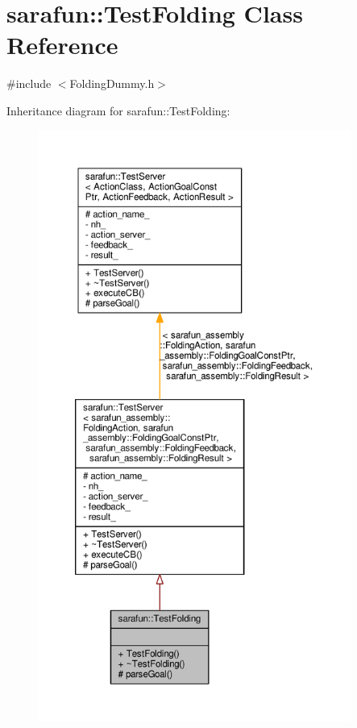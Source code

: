 \hypertarget{classsarafun_1_1TestFolding}{\section{sarafun\-:\-:Test\-Folding Class Reference}
\label{classsarafun_1_1TestFolding}
}


{\ttfamily \#include $<$Folding\-Dummy.\-h$>$}



Inheritance diagram for sarafun\-:\-:Test\-Folding\-:
\nopagebreak
\begin{figure}[H]
\begin{center}
\leavevmode
\includegraphics[height=550pt]{d5/d07/classsarafun_1_1TestFolding__inherit__graph}
\end{center}
\end{figure}


